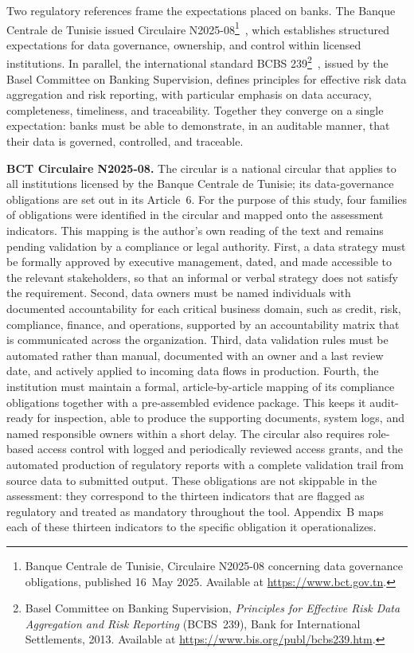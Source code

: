 Two regulatory references frame the expectations placed on banks. The Banque Centrale de Tunisie issued Circulaire N\textdegree{}2025-08\footnote{Banque Centrale de Tunisie, Circulaire N\textdegree{}2025-08 concerning data governance obligations, published 16~May 2025. Available at \url{https://www.bct.gov.tn}.}~\cite{bct2025}, which establishes structured expectations for data governance, ownership, and control within licensed institutions. In parallel, the international standard BCBS 239\footnote{Basel Committee on Banking Supervision, \emph{Principles for Effective Risk Data Aggregation and Risk Reporting} (BCBS~239), Bank for International Settlements, 2013. Available at \url{https://www.bis.org/publ/bcbs239.htm}.}~\cite{bcbs239}, issued by the Basel Committee on Banking Supervision, defines principles for effective risk data aggregation and risk reporting, with particular emphasis on data accuracy, completeness, timeliness, and traceability. Together they converge on a single expectation: banks must be able to demonstrate, in an auditable manner, that their data is governed, controlled, and traceable.

\textbf{BCT Circulaire N\textdegree{}2025-08.} The circular is a national circular that applies to all institutions licensed by the Banque Centrale de Tunisie; its data-governance obligations are set out in its Article~6. For the purpose of this study, four families of obligations were identified in the circular and mapped onto the assessment indicators. This mapping is the author's own reading of the text and remains pending validation by a compliance or legal authority. First, a data strategy must be formally approved by executive management, dated, and made accessible to the relevant stakeholders, so that an informal or verbal strategy does not satisfy the requirement. Second, data owners must be named individuals with documented accountability for each critical business domain, such as credit, risk, compliance, finance, and operations, supported by an accountability matrix that is communicated across the organization. Third, data validation rules must be automated rather than manual, documented with an owner and a last review date, and actively applied to incoming data flows in production. Fourth, the institution must maintain a formal, article-by-article mapping of its compliance obligations together with a pre-assembled evidence package. This keeps it audit-ready for inspection, able to produce the supporting documents, system logs, and named responsible owners within a short delay. The circular also requires role-based access control with logged and periodically reviewed access grants, and the automated production of regulatory reports with a complete validation trail from source data to submitted output. These obligations are not skippable in the assessment: they correspond to the thirteen indicators that are flagged as regulatory and treated as mandatory throughout the tool. Appendix~B maps each of these thirteen indicators to the specific obligation it operationalizes.


